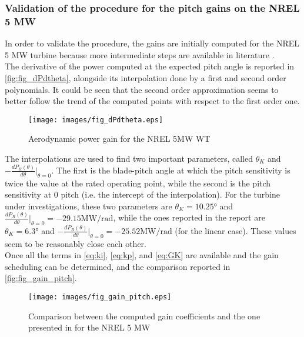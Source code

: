 \subsubsection{Validation of the procedure for the pitch gains on the NREL 5 MW}\label{subsec:gain_schdeuling_NREL5MW}
In order to validate the procedure, the gains are initially computed for the NREL 5 MW turbine because more intermediate steps are available in literature \cite{NREL_5MW_reference}.\\
The derivative of the power computed at the expected pitch angle is  reported in \autoref{fig:fig_dPdtheta}, alongside its interpolation done by a first and second order polynomials. It could be seen that the second order approximation seems to better follow the trend of the computed points with respect to the first order one. 
\begin{figure}[H]
    \centering
    \texttt{[image: images/fig\_dPdtheta.eps]}
    \caption{Aerodynamic power gain for the NREL 5MW WT}
    \label{fig:fig_dPdtheta}
\end{figure}

The interpolations are used to find two important parameters, called $\theta_{K}$ and  $-\frac{dP_R(\theta)}{d\theta}\vert_{\theta=0}$. The first is the blade-pitch angle at which the pitch sensitivity is twice the value at the rated operating point, while the second is the pitch sensitivity at 0 pitch (i.e. the intercept of the interpolation). For the turbine under investigations, these two parameters are $\theta_K=10.25 \si{\degree}$ and  $\frac{dP_R(\theta)}{d\theta}\vert_{\theta=0} = -29.15 \si{\mega\watt\per\radian}$, while the ones reported in the report are $\theta_K=6.3 \si{\degree}$ and  $-\frac{dP_R(\theta)}{d\theta}\vert_{\theta=0} = -25.52\si{\mega\watt\per\radian}$ (for the linear case). These values seem to be reasonably close each other.\\ 
Once all the terms in \autoref{eq:ki}, \ref{eq:kp}, and \ref{eq:GK} are available and the gain scheduling can be determined, and the comparison reported in \autoref{fig:fig_gain_pitch}.
\begin{figure}[H]
    \centering
    \texttt{[image: images/fig\_gain\_pitch.eps]}
    \caption{Comparison between the computed gain coefficients and the one presented in \cite{NREL_5MW_reference} for the NREL 5 MW}
    \label{fig:fig_gain_pitch}
\end{figure}


